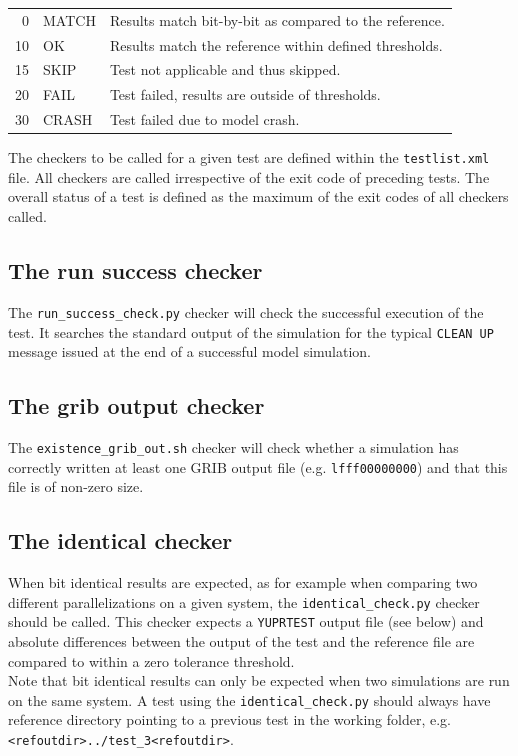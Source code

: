 \documentclass[12pt,twoside,a4paper]{report}
\newcommand{\tl}{\textless}
\newcommand{\tg}{\textgreater}
\begin{document}
\begin{tabular}{rlp{10cm}}
0 & {\color{green} MATCH} & Results match bit-by-bit as compared to the reference.\\[1.2ex]
10 & {\color{green} OK} & Results match the reference within defined thresholds.\\[1.2ex]
15 & {\color{grey} SKIP} & Test not applicable and thus skipped.\\[1.2ex]
20 & {\color{red} FAIL} & Test failed, results are outside of thresholds.\\[1.2ex]
30 & {\color{red} CRASH} & Test failed due to model crash.\\[1.2ex]
\end{tabular}

The checkers to be called for a given test are defined within the \texttt{testlist.xml} file. All checkers are called irrespective of the exit code of preceding tests. The overall status of a test is defined as the maximum of the exit codes of all checkers called.

\subsection{The run success checker}

The \texttt{run\_success\_check.py} checker will check the successful execution of the test. It searches the standard output of the simulation for the typical \texttt{CLEAN UP} message issued at the end of a successful model simulation.

\subsection{The grib output checker}

The \texttt{existence\_grib\_out.sh} checker will check whether a simulation has correctly written at least one GRIB output file (e.g. \texttt{lfff00000000}) and that this file is of non-zero size.

\subsection{The identical checker}

When bit identical results are expected, as for example when comparing two different parallelizations on a given system, the \texttt{identical\_check.py} checker should be called. This checker expects a \texttt{YUPRTEST} output file (see below) and absolute differences between the output of the test and the reference file are compared to within a zero tolerance threshold.\\
Note that bit identical results can only be expected when two simulations are run on the same system. A test using the \texttt{identical\_check.py} should always have reference directory pointing to a previous test in the working folder, e.g. \texttt{\tl refoutdir\tg../test\_3\tl refoutdir\tg}.
\end{document}
